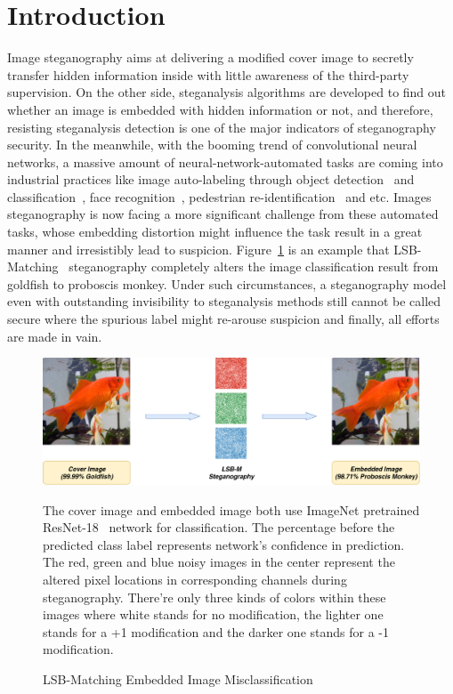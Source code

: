 \section{Introduction}

Image steganography aims at delivering a modified cover image to secretly transfer hidden information inside with little awareness of the third-party supervision. On the other side, steganalysis algorithms are developed to find out whether an image is embedded with hidden information or not, and therefore, resisting steganalysis detection is one of the major indicators of steganography security. In the meanwhile, with the booming trend of convolutional neural networks, a massive amount of neural-network-automated tasks are coming into industrial practices like image auto-labeling through object detection~\cite{Fast_R_CNN,YOLO} and classification~\cite{ResNet,InceptionV4}, face recognition~\cite{FaceNet}, pedestrian re-identification~\cite{CamStylePedestrian} and etc. Images steganography is now facing a more significant challenge from these automated tasks, whose embedding distortion might influence the task result in a great manner and irresistibly lead to suspicion. Figure~\ref{fig:steganography_distortion} is an example that LSB-Matching~\cite{LSBRevisited} steganography completely alters the image classification result from goldfish to proboscis monkey. Under such circumstances, a steganography model even with outstanding invisibility to steganalysis methods still cannot be called secure where the spurious label might re-arouse suspicion and finally, all efforts are made in vain.

\begin{figure}
  \centering
  \includegraphics[width=0.9\columnwidth]{images/Steganography-Distortion/Steganography-Distortion.png}%
  \caption{LSB-Matching Embedded Image Misclassification}%
  \label{fig:steganography_distortion}
  \vspace{\baselineskip}
  The cover image and embedded image both use ImageNet pretrained ResNet-18~\cite{ResNet} network for classification. The percentage before the predicted class label represents network's confidence in prediction. The red, green and blue noisy images in the center represent the altered pixel locations in corresponding channels during steganography. There're only three kinds of colors within these images where white stands for no modification, the lighter one stands for a +1 modification and the darker one stands for a -1 modification.
\end{figure}

